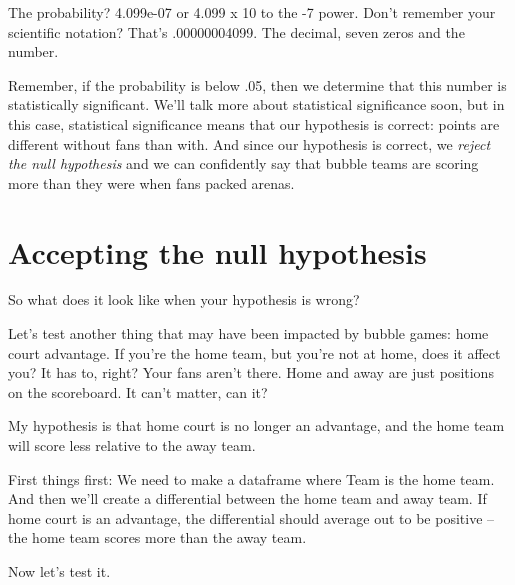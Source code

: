 \documentclass[
]{book}
\newenvironment{Shaded}{\begin{snugshade}}{\end{snugshade}}
\newcommand{\DataTypeTok}[1]{\textcolor[rgb]{0.13,0.29,0.53}{#1}}
\newcommand{\KeywordTok}[1]{\textcolor[rgb]{0.13,0.29,0.53}{\textbf{#1}}}
\newcommand{\NormalTok}[1]{#1}
\newcommand{\OperatorTok}[1]{\textcolor[rgb]{0.81,0.36,0.00}{\textbf{#1}}}
\newcommand{\OtherTok}[1]{\textcolor[rgb]{0.56,0.35,0.01}{#1}}
\newcommand{\StringTok}[1]{\textcolor[rgb]{0.31,0.60,0.02}{#1}}
\begin{document}
The probability? 4.099e-07 or 4.099 x 10 to the -7 power. Don't remember your scientific notation? That's .00000004099. The decimal, seven zeros and the number.

Remember, if the probability is below .05, then we determine that this number is statistically significant. We'll talk more about statistical significance soon, but in this case, statistical significance means that our hypothesis is correct: points are different without fans than with. And since our hypothesis is correct, we \emph{reject the null hypothesis} and we can confidently say that bubble teams are scoring more than they were when fans packed arenas.

\hypertarget{accepting-the-null-hypothesis}{%
\section{Accepting the null hypothesis}\label{accepting-the-null-hypothesis}}

So what does it look like when your hypothesis is wrong?

Let's test another thing that may have been impacted by bubble games: home court advantage. If you're the home team, but you're not at home, does it affect you? It has to, right? Your fans aren't there. Home and away are just positions on the scoreboard. It can't matter, can it?

My hypothesis is that home court is no longer an advantage, and the home team will score less relative to the away team.

First things first: We need to make a dataframe where Team is the home team. And then we'll create a differential between the home team and away team. If home court is an advantage, the differential should average out to be positive -- the home team scores more than the away team.

\begin{Shaded}
\end{Shaded}

Now let's test it.
\end{document}
